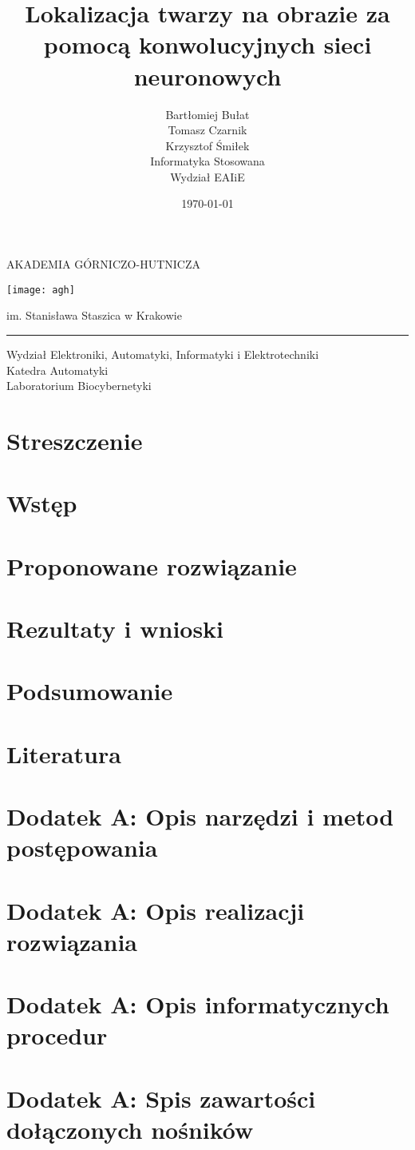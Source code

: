 \documentclass[11pt,a4paper]{article}
\title{
    Lokalizacja twarzy na obrazie za pomocą konwolucyjnych sieci neuronowych
}
\author{
    Bartłomiej Bułat\\
    Tomasz Czarnik\\
    Krzysztof Śmiłek\\
    Informatyka Stosowana\\
    Wydział EAIiE}
\date{\today}
\newcommand{\maketitlepage}{
\begin{center}

\LARGE{AKADEMIA GÓRNICZO-HUTNICZA}

\vspace*{1cm}
\texttt{[image: agh]}
\vspace*{1cm}

\LARGE{im. Stanisława Staszica w Krakowie}

\rule{\textwidth}{0.2mm}

\vspace*{5mm}

\large{Wydział Elektroniki, Automatyki, Informatyki i Elektrotechniki}\\
\large{Katedra Automatyki}\\
\large{Laboratorium Biocybernetyki}\\


\vspace*{1cm}


\end{center}

}
\begin{document}
\maketitlepage

\section{Streszczenie}

\section{Wstęp}

\section{Proponowane rozwiązanie}

\section{Rezultaty i wnioski}

\section{Podsumowanie}

\section{Literatura}

\section{Dodatek A: Opis narzędzi i metod postępowania}
\section{Dodatek A: Opis realizacji rozwiązania}
\section{Dodatek A: Opis informatycznych procedur}
\section{Dodatek A: Spis zawartości dołączonych nośników}
\end{document}
